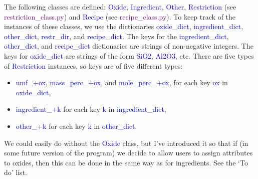 \documentclass[a4paper,10pt]{article}
\def\'{\textquotesingle}
\def\blue{\textcolor{blue}}
\def\green{\textcolor{Purple}}
\begin{document}
The following classes are defined: \blue{Oxide}, \blue{Ingredient}, \blue{Other}, \blue{Restriction} (see \green{restriction\_class.py}) and \blue{Recipe} (see \green{recipe\_class.py}). To keep track of the instances of these classes, we use the dictionaries \blue{oxide\_dict}, \blue{ingredient\_dict}, \blue{other\_dict}, \blue{restr\_dir}, and \blue{recipe\_dict}. The keys for the \blue{ingredient\_dict}, \blue{other\_dict}, and \blue{recipe\_dict} dictionaries are strings of non-negative integers. The keys for \blue{oxide\_dict} are strings of the form \blue{\'SiO2\'}, \blue{\'Al2O3\'}, etc.  There are five types of \blue{Restriction} instances, so keys are of five different types:
\begin{itemize}
\item \blue{\'umf\_\'+ox}, \blue{\'mass\_perc\_\'+ox}, and \blue{\'mole\_perc\_\'+ox}, for each key \blue{ox} in \blue{oxide\_dict},
\item \blue{\'ingredient\_\'+k} for each key \blue{k} in \blue{ingredient\_dict}, 
\item \blue{\'other\_\'+k} for each key \blue{k} in \blue{other\_dict}. 
\end{itemize}

We could easily do without the \blue{Oxide} class, but I've introduced it so that if (in some future version of the program) we decide to allow users to assign attributes to oxides, then this can be done in the same way as for ingredients. See the `To do' list.
\end{document}

